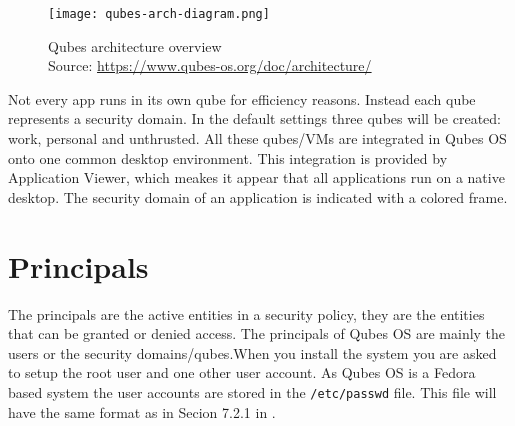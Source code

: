\documentclass[runningheads,a4paper]{article}
\begin{document}
\begin{figure}[h]
  \centering
  \texttt{[image: qubes-arch-diagram.png]}
  \caption{Qubes architecture overview\\
    Source: \protect\url{https://www.qubes-os.org/doc/architecture/}}
  \label{fig:qubesarch}
\end{figure}


Not every app runs in its own qube for efficiency reasons. Instead
each qube represents a security domain. In the default settings three
qubes will be created: work, personal and unthrusted. All these
qubes/VMs are integrated in Qubes OS onto one common desktop
environment. This integration is provided by Application Viewer, which
meakes it appear that all applications run on a native desktop. The
security domain of an application is indicated with a colored frame.

\section{Principals} 

The principals are the active entities in a security policy, they are
the entities that can be granted or denied access. The principals of
Qubes OS are mainly the users or the security domains/qubes.When you install the system you are asked to setup the root user and one other user account. As Qubes OS is a Fedora based system the user accounts are stored in the \texttt{/etc/passwd} file. This file will have the same format as in Secion 7.2.1 in \cite{GollmannComputerSecurity}. 
\end{document}
